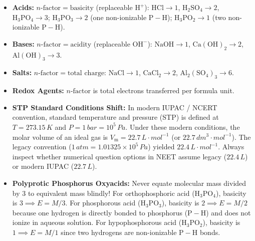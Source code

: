 \documentclass[10pt,twoside,openright]{book}
\begin{document}
\begin{ncertbox}
\begin{itemize}
  \item \textbf{Acids:} $n\text{-factor} = \text{basicity}$ (replaceable $\mathrm{H}^+$):
  $\mathrm{HCl} \to 1$, $\mathrm{H_2SO_4} \to 2$, $\mathrm{H_3PO_4} \to 3$; $\mathrm{H_3PO_3} \to 2$ (one non-ionizable $\mathrm{P-H}$); $\mathrm{H_3PO_2} \to 1$ (two non-ionizable $\mathrm{P-H}$).
  \item \textbf{Bases:} $n\text{-factor} = \text{acidity}$ (replaceable $\mathrm{OH}^-$): $\mathrm{NaOH} \to 1$, $\mathrm{Ca(OH)_2} \to 2$, $\mathrm{Al(OH)_3} \to 3$.
  \item \textbf{Salts:} $n\text{-factor} = \text{total charge}$: $\mathrm{NaCl} \to 1$, $\mathrm{CaCl_2} \to 2$, $\mathrm{Al_2(SO_4)_3} \to 6$.
  \item \textbf{Redox Agents:} $n\text{-factor}$ is total electrons transferred per formula unit.
\end{itemize}
\end{ncertbox}

\begin{trapbox}
\begin{itemize}
  \item \textbf{STP Standard Conditions Shift:} In modern IUPAC / NCERT convention, standard temperature and pressure (STP) is defined at $T = 273.15\,\si{K}$ and $P = 1\,\si{bar} = 10^5\,\si{Pa}$. Under these modern conditions, the molar volume of an ideal gas is $V_{\mathrm{m}} = 22.7\,\si{L\cdot mol^{-1}}$ (or $22.7\,\si{dm^3\cdot mol^{-1}}$). The legacy convention ($1\,\si{atm} = 1.01325\times 10^5\,\si{Pa}$) yielded $22.4\,\si{L\cdot mol^{-1}}$. Always inspect whether numerical question options in NEET assume legacy ($22.4\,\si{L}$) or modern IUPAC ($22.7\,\si{L}$).
  \item \textbf{Polyprotic Phosphorus Oxyacids:} Never equate molecular mass divided by 3 to equivalent mass blindly! For orthophosphoric acid ($\mathrm{H_3PO_4}$), basicity is $3 \implies E = M/3$. For phosphorous acid ($\mathrm{H_3PO_3}$), basicity is $2 \implies E = M/2$ because one hydrogen is directly bonded to phosphorus ($\mathrm{P-H}$) and does not ionize in aqueous solution. For hypophosphorous acid ($\mathrm{H_3PO_2}$), basicity is $1 \implies E = M/1$ since two hydrogens are non-ionizable $\mathrm{P-H}$ bonds.
\end{itemize}
\end{trapbox}
\end{document}
